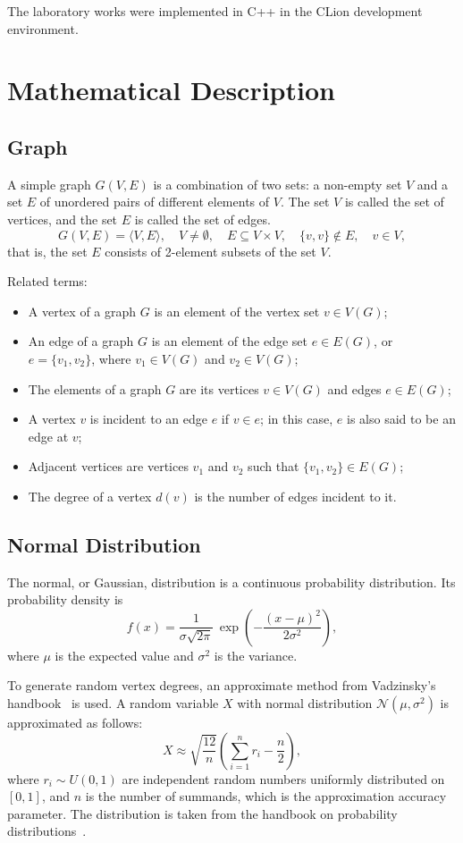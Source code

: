 \documentclass[a4paper,final]{article}
\begin{document}
\medskip
The laboratory works were implemented in C++ in the CLion development environment.

\newpage
	\section{Mathematical Description}
	\subsection{Graph}

A simple graph $G(V, E)$ is a combination of two sets: a non-empty set $V$ and a set $E$ of unordered pairs of different elements of $V$. The set $V$ is called the set of vertices, and the set $E$ is called the set of edges.
\[
G(V,E) = \langle V, E\rangle,\quad V \neq \emptyset,\quad E \subseteq V \times V,\quad \{v,v\} \notin E,\quad v \in V,
\]
that is, the set $E$ consists of 2-element subsets of the set $V$.

Related terms:
\begin{itemize}
  \item A vertex of a graph $G$ is an element of the vertex set $v \in V(G)$;
  \item An edge of a graph $G$ is an element of the edge set $e \in E(G)$, or $e = \{v_1, v_2\}$, where $v_1 \in V(G)$ and $v_2 \in V(G)$;
  \item The elements of a graph $G$ are its vertices $v \in V(G)$ and edges $e \in E(G)$;
  \item A vertex $v$ is incident to an edge $e$ if $v \in e$; in this case, $e$ is also said to be an edge at $v$;
  \item Adjacent vertices are vertices $v_1$ and $v_2$ such that $\{v_1,v_2\} \in E(G)$;
  \item The degree of a vertex $d(v)$ is the number of edges incident to it.
\end{itemize}

	\subsection{Normal Distribution}

The normal, or Gaussian, distribution is a continuous probability distribution. Its probability density is
\[
f(x) = \frac{1}{\sigma\sqrt{2\pi}}\,\exp\!\left(-\frac{(x-\mu)^2}{2\sigma^2}\right),
\]
where $\mu$ is the expected value and $\sigma^2$ is the variance.

To generate random vertex degrees, an approximate method from Vadzinsky's handbook~\cite{vadzinsky} is used. A random variable $X$ with normal distribution $\mathcal{N}(\mu,\sigma^2)$ is approximated as follows:
\[
X \approx \sqrt{\frac{12}{n}}\left(\sum_{i=1}^{n} r_i - \frac{n}{2}\right),
\]
where $r_i \sim U(0,1)$ are independent random numbers uniformly distributed on $[0,1]$, and $n$ is the number of summands, which is the approximation accuracy parameter. The distribution is taken from the handbook on probability distributions~\cite{vadzinsky}.
\end{document}
